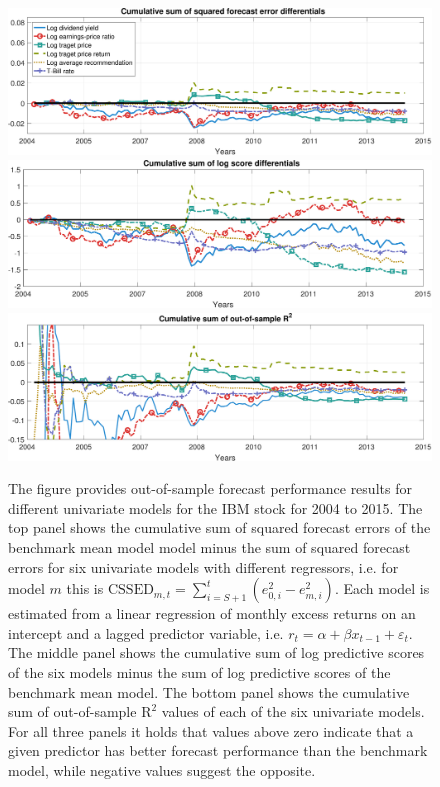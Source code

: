 \begin{figure}[ht!]
	\centering
	\includegraphics[width=1\linewidth]{../plots/IBM_CSSED_plot}
	\includegraphics[width=1\linewidth]{../plots/IBM_CLSD_plot}
	\includegraphics[width=1\linewidth]{../plots/IBM_R2_plot}
	\caption[Out-of-sample forecast performance results for different univariate models for the IBM stock for 2004 to 2015]{The figure provides out-of-sample forecast performance results for different univariate models for the IBM stock for 2004 to 2015. The top panel shows the cumulative sum of squared forecast errors of the benchmark mean model model minus the sum of squared forecast errors for six univariate models with different regressors, i.e. for model $m$ this is $\text{CSSED}_{m,t}=\sum_{i=S+1}^{t}\left(e_{0,i}^2-e_{m,i}^2\right)$. Each model is estimated from a linear regression of monthly excess returns on an intercept and a lagged predictor variable, i.e. $r_t=\alpha+\beta x_{t-1}+\varepsilon_t$. The middle panel shows the cumulative sum of log predictive scores of the six models minus the sum of log predictive scores of the benchmark mean model. The bottom panel shows the cumulative sum of out-of-sample $\text{R}^2$ values of each of the six univariate models. For all three panels it holds that values above zero indicate that a given predictor has better forecast performance than the benchmark model, while negative values suggest the opposite.}
	\label{fig:ibmclsdplot}
\end{figure}



